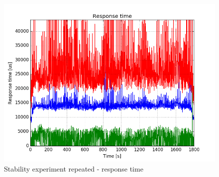 \documentclass[11pt]{article}
\begin{document}
\begin{figure}
\centering
\includegraphics[width=0.95\linewidth]{plots/mm1_response_time}
\caption{Stability experiment repeated - response time}
\label{fig:mm1-response-time}
\end{figure}
\end{document}
